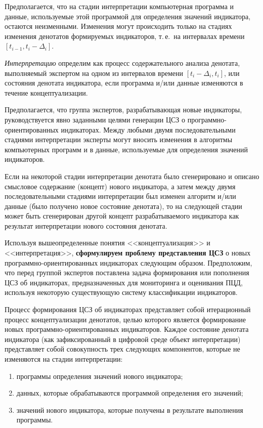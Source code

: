 \begin{multicols}{2}
   Предполагается, что на стадии интерпретации компьютерная программа и данные, 
используемые этой программой для определения значений индикатора, остаются 
неизменными. Изменения могут происходить только на стадиях изменения денотатов 
формируемых индикаторов, т.\,е.\ на интервалах времени $[t_{i-1}, t_i - \Delta_i]$.
   
   \textit{Интерпретацию} определим как процесс содержательного анализа денотата, 
выполняемый экспертом на одном из интервалов времени $[t_i -\Delta_i, t_i]$, или состояния 
денотата индикатора, если программа и/или данные изменяются в течение 
концептуализации.
   
   Предполагается, что группа экспертов, разрабатывающая новые индикаторы, 
руководствуется явно заданными целями генерации ЦСЗ о про\-грам\-мно-ориентированных 
индикаторах. Между любыми двумя последовательными стадиями интерпретации эксперты 
могут вносить изменения в алгоритмы компьютерных программ и в данные, используемые 
для определения значений индикаторов.
   
   Если на некоторой стадии интерпретации денотата было сгенерировано и описано 
смысловое содержание (концепт) нового индикатора, а затем между двумя 
последовательными стадиями интерпретации был изменен алгоритм и/или данные (было 
получено новое состояние денотата), то на следующей стадии может быть сгенерирован 
другой концепт разрабатываемого индикатора как результат интерпретации нового 
состояния денотата.
   
   Используя вышеопределенные понятия <<концептуализация>> и <<интерпретация>>, 
\textbf{сформулируем проблему представления ЦСЗ} о новых 
   программно-ориентированных индикаторах следующим образом. Предположим, что 
перед группой экспертов поставлена задача формирования или пополнения ЦСЗ об 
индикаторах, предназначенных для мониторинга и оценивания ПЦД, используя некоторую 
существующую систему классификации индикаторов.
   
   Процесс формирования ЦСЗ об индикаторах представляет собой итерационный процесс 
концептуализации денотатов, целью которого является формирование новых 
   программно-ори\-ен\-ти\-ро\-ван\-ных индикаторов. Каждое состояние денотата индикатора (как 
зафиксированный в циф\-ро\-вой среде объект интерпретации) представляет собой 
совокупность трех следующих компонентов, которые не изменяются на стадии 
интерпретации:
   \begin{enumerate}[(1)]
\item программы определения значений нового индикатора;
\item данных, которые обрабатываются программой определения его значений;
\item значений нового индикатора, которые получены в результате выполнения программы.
\end{enumerate}


\end{multicols}
